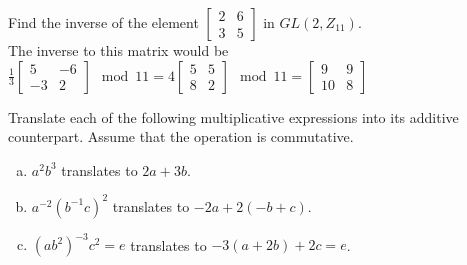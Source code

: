 \documentclass[12pt]{article}
\makeatletter
\theoremstyle{homework}
\newenvironment{exercise}[1]
{\def\@currentlabel{#1}\exercisecore}
{\endexercisecore}
\makeatother
\begin{document}
\begin{exercise}
{2.11}
Find the inverse of the element $\begin{bmatrix}
2&6\\ 3&5
\end{bmatrix} $ in $GL(2, Z_{11} )$.\\
The inverse to this matrix would be $\frac{1}{3}\begin{bmatrix}
5&-6\\ -3&2
\end{bmatrix}\mod 11= 4\begin{bmatrix}
5&5\\ 8&2
\end{bmatrix}\mod 11=
\begin{bmatrix}
9&9\\
10&8
\end{bmatrix}$
\end{exercise}

\begin{exercise}
{2.13}
Translate each of the following multiplicative expressions into its additive counterpart. Assume that the operation is commutative.
\begin{enumerate}[(a)]
\item
$a^2 b^3$ translates to $2a+3b$.
\item
$a^{-2} (b^{-1} c)^2$ translates to $-2a+2(-b+c)$.
\item
$(ab^2 )^{-3} c^2 = e$ translates to $-3(a+2b ) +2c = e$.
\end{enumerate}
\end{exercise}
\end{document}

